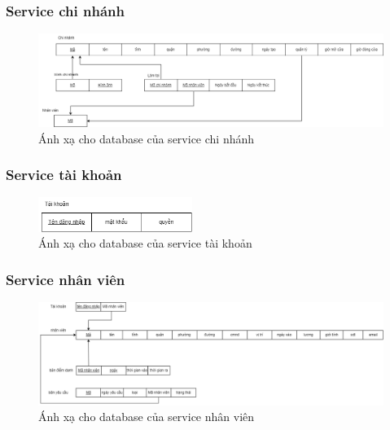 \subsubsection{Service chi nhánh}
\begin{figure}[!htp]
    \begin{center}
        \includegraphics[width=1\textwidth]{img/database/mapping/branch.png}
        \newline
        \caption{Ánh xạ cho database của service chi nhánh}
    \end{center}
\end{figure}


\subsubsection{Service tài khoản}
\begin{figure}[!htp]
    \begin{center}
        \includegraphics[width=5cm]{img/database/mapping/account.png}
        \newline
        \caption{Ánh xạ cho database của service tài khoản}
    \end{center}
\end{figure}

\subsubsection{Service nhân viên}
\begin{figure}[!htp]
    \begin{center}
        \includegraphics[width=1\textwidth]{img/database/mapping/staff.png}
        \newline
        \caption{Ánh xạ cho database của service nhân viên}
    \end{center}
\end{figure}


